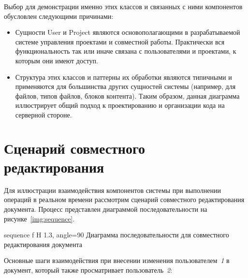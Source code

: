 \clearpage
Выбор для демонстрации именно этих классов и связанных с ними компонентов обусловлен следующими причинами:
\begin{itemize}
    \item Сущности User и Project являются основополагающими в разрабатываемой системе управления проектами и совместной работы. Практически вся функциональность так или иначе связана с пользователями и проектами, к которым они имеют доступ.
    \item Структура этих классов и паттерны их обработки являются типичными и применяются для большинства других сущностей системы (например, для файлов, типов файлов, блоков контента). Таким образом, данная диаграмма иллюстрирует общий подход к проектированию и организации кода на серверной стороне.
\end{itemize}

\section{Сценарий совместного редактирования}

Для иллюстрации взаимодействия компонентов системы при выполнении операций в реальном времени рассмотрим сценарий совместного редактирования документа. 
\clearpage
Процесс представлен диаграммой последовательности на рисунке~\ref{img:sequence}.

	{sequence}
	{f}
	{H}
	{1.3\textwidth, angle=90}
	{Диаграмма последовательности для совместного редактирования документа}

Основные шаги взаимодействия при внесении изменения пользователем~\textit{1} в документ, который также просматривает пользователь~\textit{2}:

